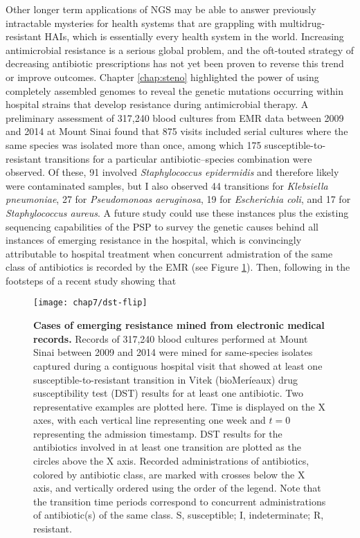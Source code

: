 Other longer term applications of NGS may be able to answer previously intractable mysteries for health systems that are grappling with multidrug\hyp{}resistant HAIs, which is essentially every health system in the world. Increasing antimicrobial resistance is a serious global problem, and the oft-touted strategy of decreasing antibiotic prescriptions has not yet been proven to reverse this trend or improve outcomes.\autocite{Policy2010,Wagner2014} Chapter \ref{chap:steno} highlighted the power of using completely assembled genomes to reveal the genetic mutations occurring within hospital strains that develop resistance during antimicrobial therapy. A preliminary assessment of 317,240 blood cultures from EMR data between 2009 and 2014 at Mount Sinai found that 875 visits included serial cultures where the same species was isolated more than once, among which 175 susceptible-to-resistant transitions for a particular antibiotic–species combination were observed. Of these, 91 involved \emph{Staphylococcus epidermidis} and therefore likely were contaminated samples, but I also observed 44 transitions for \emph{Klebsiella pneumoniae}, 27 for \emph{Pseudomonoas aeruginosa}, 19 for \emph{Escherichia coli}, and 17 for \emph{Staphylococcus aureus}. A future study could use these instances plus the existing sequencing capabilities of the PSP to survey the genetic causes behind all instances of emerging resistance in the hospital, which is convincingly attributable to hospital treatment when concurrent admistration of the same class of antibiotics is recorded by the EMR (see Figure \ref{fig:dst_flip}). Then, following in the footsteps of a recent study showing that 
\begin{figure}[htb]
  \centering
  \texttt{[image: chap7/dst-flip]}
  \caption[Cases of emerging resistance mined from electronic medical records]{\textbf{Cases of emerging resistance mined from electronic medical records.} Records of 317,240 blood cultures performed at Mount Sinai between 2009 and 2014 were mined for same-species isolates captured during a contiguous hospital visit that showed at least one susceptible-to-resistant transition in Vitek (bioMeríeaux) drug susceptibility test (DST) results for at least one antibiotic. Two representative examples are plotted here. Time is displayed on the X axes, with each vertical line representing one week and $t=0$ representing the admission timestamp. DST results for the antibiotics involved in at least one transition are plotted as the circles above the X axis. Recorded administrations of antibiotics, colored by antibiotic class, are marked with crosses below the X axis, and vertically ordered using the order of the legend. Note that the transition time periods correspond to concurrent administrations of antibiotic(s) of the same class. S, susceptible; I, indeterminate; R, resistant.
  }
  \label{fig:dst_flip}
\end{figure}
